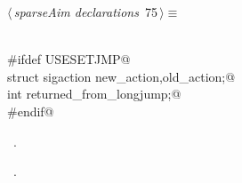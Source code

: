 \documentclass{article}
\begin{document}
\begin{flushleft} \small
\begin{minipage}{\linewidth}\label{scrap112}\raggedright\small
{} $\langle\,${\itshape sparseAim declarations}\nobreak\ {\footnotesize {75}}$\,\rangle\equiv$
\vspace{-1ex}
\begin{list}{}{} \item
\mbox{}\verb@@\\
\mbox{}\verb@#ifdef USESETJMP@\\
\mbox{}\verb@ struct sigaction new_action,old_action;@\\
\mbox{}\verb@  int returned_from_longjump;@\\
\mbox{}\verb@#endif@\\
\mbox{}\verb@@{\NWsep}
\end{list}
\vspace{-1.5ex}
\footnotesize
\begin{list}{}{\setlength{\itemsep}{-\parsep}\setlength{\itemindent}{-\leftmargin}}
\item \NWtxtMacroDefBy\ .
\item \NWtxtMacroRefIn\ .

\item{}
\end{list}
\end{minipage}\vspace{4ex}
\end{flushleft}
\end{document}

